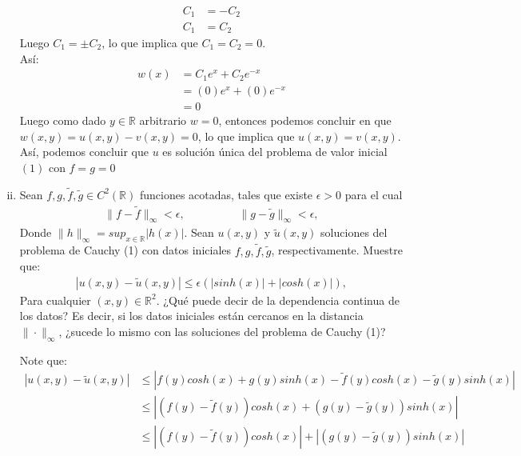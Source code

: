 \begin{homeworkProblem}
\begin{enumerate}[i)]
\begin{solucion}
        \begin{align*}
            C_1&=-C_2\\
            C_1&=C_2
        \end{align*}
        Luego $C_1=\pm C_2$, lo que implica que $C_1=C_2=0$.\\
        Así:
        \begin{align*}
            w(x)&=C_1e^{x}+C_2e^{-x}\\
            &=(0)e^{x}+(0)e^{-x}\\
            &=0
        \end{align*}
        Luego como dado $y\in \mathbb{R}$ arbitrario $w=0$, entonces podemos concluir en que $w(x,y)=u(x,y)-v(x,y)=0$, lo que implica que $u(x,y)=v(x,y)$.\\
        Así, podemos concluir que $u$ es solución única del problema de valor inicial $(1)$ con $f=g=0$
        \demostrado
    \end{solucion}
    \item Sean $f,g,\widetilde{f},\widetilde{g}\in C^{2}(\mathbb{R})$ funciones acotadas, tales que existe $\epsilon>0$ para el cual
    \begin{align*}
        \|f-\widetilde{f}\|_{\infty}<\epsilon, \hspace{2cm} \|g-\widetilde{g}\|_{\infty}<\epsilon,
    \end{align*}
    Donde $\|h\|_{\infty}=sup_{x\in\mathbb{R}}|h(x)|$. Sean $u(x,y)$ y $\widetilde{u}(x,y)$ soluciones del problema de Cauchy (1) con datos iniciales $f,g,\widetilde{f},\widetilde{g}$, respectivamente. Muestre que:
    \begin{align*}
        |u(x,y)-\widetilde{u}(x,y)|\leq\epsilon(|sinh(x)|+|cosh(x)|),
    \end{align*}
    Para cualquier $(x,y)\in\mathbb{R}^2$. ¿Qué puede decir de la dependencia continua de los datos? Es decir, si los datos iniciales están cercanos en la distancia $\| \cdot \|_{\infty}$, ¿sucede lo mismo con las soluciones del problema de Cauchy (1)?
    \begin{solucion}
        Note que:
        \begin{align*}
            |u(x,y)-\widetilde{u}(x,y)|&\leq|f(y)cosh(x)+g(y)sinh(x)-\widetilde{f}(y)cosh(x)-\widetilde{g}(y)sinh(x)|\\
            &\leq |(f(y)-\widetilde{f}(y))cosh(x)+(g(y)-\widetilde{g}(y))sinh(x)|\\
            &\leq |(f(y)-\widetilde{f}(y))cosh(x)|+|(g(y)-\widetilde{g}(y))sinh(x)|\\

\end{align*}
\end{solucion}
\end{enumerate}
\end{homeworkProblem}
